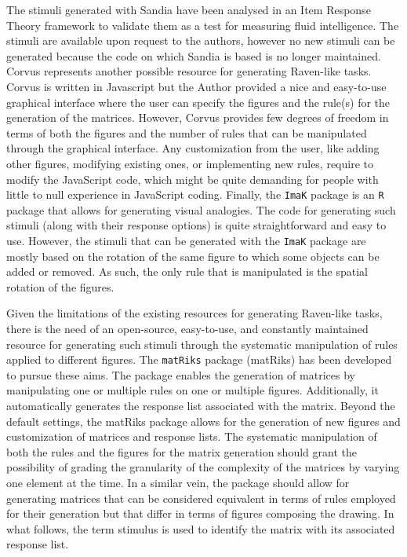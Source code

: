 The stimuli generated with Sandia have been analysed in an Item Response Theory framework to validate them as a test for measuring fluid intelligence.
The stimuli are available upon request to the authors, however no new stimuli can be generated because the code on which Sandia is based is no longer maintained.
Corvus represents another possible resource for generating Raven-like tasks.
Corvus is written in Javascript but the Author provided a nice and easy-to-use graphical interface where the user can specify the figures and the rule(s) for the generation of the matrices.
However, Corvus provides few degrees of freedom in terms of both the figures and the number of rules that can be manipulated through the graphical interface.
Any customization from the user, like adding other figures, modifying existing ones, or implementing new rules, require to modify the JavaScript code, which might be quite demanding for people with little to null experience in JavaScript coding.
Finally, the \texttt{ImaK} package is an \texttt{R} package that allows for generating visual analogies.
The code for generating such stimuli (along with their response options) is quite straightforward and easy to use.
However, the stimuli that can be generated with the \texttt{ImaK} package are mostly based on the rotation of the same figure to which some objects can be added or removed.
As such, the only rule that is manipulated is the spatial rotation of the figures.

Given the limitations of the existing resources for generating Raven-like tasks, there is the need of an open-source, easy-to-use, and constantly maintained resource for generating such stimuli through the systematic manipulation of rules applied to different figures.
The \texttt{matRiks} package (matRiks) has been developed to pursue these aims.
The package enables the generation of matrices by manipulating one or multiple rules on one or multiple figures.
Additionally, it automatically generates the response list associated with the matrix.
Beyond the default settings, the matRiks package allows for the generation of new figures and customization of matrices and response lists.
The systematic manipulation of both the rules and the figures for the matrix generation should grant the possibility of grading the granularity of the complexity of the matrices by varying one element at the time.
In a similar vein, the package should allow for generating matrices that can be considered equivalent in terms of rules employed for their generation but that differ in terms of figures composing the drawing.
In what follows, the term stimulus is used to identify the matrix with its associated response list.


